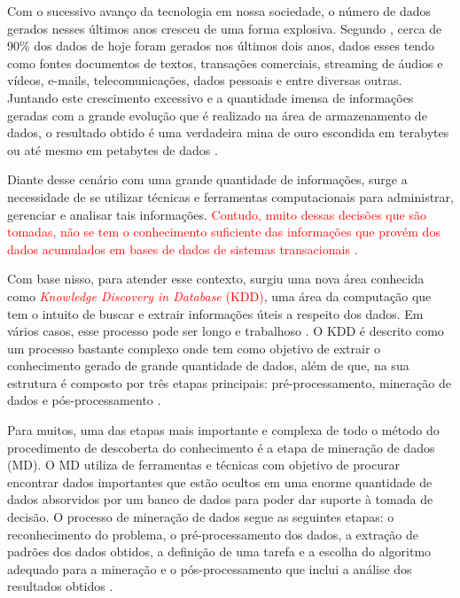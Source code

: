 
\par
Com o sucessivo avanço da tecnologia em nossa sociedade, o número de dados gerados nesses últimos anos cresceu de uma forma explosiva. Segundo , cerca de 90\% dos dados de hoje foram gerados nos últimos dois anos, dados esses tendo como fontes documentos de textos, transações comerciais, streaming de áudios e vídeos, e-mails, telecomunicações, dados pessoais e entre diversas outras. Juntando este crescimento excessivo e a quantidade imensa de informações geradas com a grande evolução que é realizado na área de armazenamento de dados, o resultado obtido é uma verdadeira mina de ouro escondida em terabytes ou até mesmo em petabytes de dados \cite{Carvalho2014}. 

\par
Diante desse cenário com uma grande quantidade de informações, surge a necessidade de se utilizar técnicas e ferramentas computacionais para administrar, gerenciar e analisar tais informações. \textcolor{red}{Contudo, muito dessas decisões que são tomadas, não se tem o conhecimento suficiente das informações que provém dos dados acumulados em bases de dados de sistemas transacionais \cite{Rabelo2007}.}

\par
Com base nisso, para atender esse contexto, surgiu uma nova área conhecida como \textcolor{red}{ \textit{Knowledge Discovery in Database} (KDD)}, uma área da computação que tem o intuito de buscar e extrair informações úteis a respeito dos dados. Em vários casos, esse processo pode ser longo e trabalhoso \cite{Stulp2014}. O KDD é descrito como um processo bastante complexo onde tem como objetivo de extrair o conhecimento gerado de grande quantidade de dados, além de que, na sua estrutura é composto por três etapas principais: pré-processamento, mineração de dados e pós-processamento \cite{Rabelo2007}.

\par
Para muitos, uma das etapas mais importante e complexa de todo o método do procedimento de descoberta do conhecimento é a etapa de mineração de dados (MD). O MD utiliza de ferramentas e técnicas com objetivo de procurar encontrar dados importantes que estão ocultos em uma enorme quantidade de dados absorvidos por um banco de dados para poder dar suporte à tomada de decisão. O processo de mineração de dados segue as seguintes etapas: o reconhecimento do problema, o pré-processamento dos dados, a extração de padrões dos dados obtidos, a definição de uma tarefa e a escolha do algoritmo adequado para a mineração e o pós-processamento que inclui a análise dos resultados obtidos \cite{Stulp2014}. 

